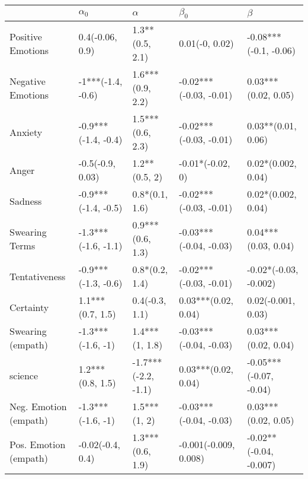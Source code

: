 \begin{tabular}{lllll}
\toprule
{} &           $\alpha_0$ &             $\alpha$ &               $\beta_0$ &                 $\beta$ \\
\midrule
Positive Emotions     &      0.4(-0.06, 0.9) &      1.3**(0.5, 2.1) &          0.01(-0, 0.02) &   -0.08***(-0.1, -0.06) \\
Negative Emotions     &    -1***(-1.4, -0.6) &     1.6***(0.9, 2.2) &  -0.02***(-0.03, -0.01) &     0.03***(0.02, 0.05) \\
Anxiety               &  -0.9***(-1.4, -0.4) &     1.5***(0.6, 2.3) &  -0.02***(-0.03, -0.01) &      0.03**(0.01, 0.06) \\
Anger                 &     -0.5(-0.9, 0.03) &        1.2**(0.5, 2) &        -0.01*(-0.02, 0) &      0.02*(0.002, 0.04) \\
Sadness               &  -0.9***(-1.4, -0.5) &       0.8*(0.1, 1.6) &  -0.02***(-0.03, -0.01) &      0.02*(0.002, 0.04) \\
Swearing Terms        &  -1.3***(-1.6, -1.1) &     0.9***(0.6, 1.3) &  -0.03***(-0.04, -0.03) &     0.04***(0.03, 0.04) \\
Tentativeness         &  -0.9***(-1.3, -0.6) &       0.8*(0.2, 1.4) &  -0.02***(-0.03, -0.01) &   -0.02*(-0.03, -0.002) \\
Certainty             &     1.1***(0.7, 1.5) &       0.4(-0.3, 1.1) &     0.03***(0.02, 0.04) &      0.02(-0.001, 0.03) \\
Swearing (empath)     &    -1.3***(-1.6, -1) &       1.4***(1, 1.8) &  -0.03***(-0.04, -0.03) &     0.03***(0.02, 0.04) \\
science               &     1.2***(0.8, 1.5) &  -1.7***(-2.2, -1.1) &     0.03***(0.02, 0.04) &  -0.05***(-0.07, -0.04) \\
Neg. Emotion (empath) &    -1.3***(-1.6, -1) &         1.5***(1, 2) &  -0.03***(-0.04, -0.03) &     0.03***(0.02, 0.05) \\
Pos. Emotion (empath) &     -0.02(-0.4, 0.4) &     1.3***(0.6, 1.9) &   -0.001(-0.009, 0.008) &  -0.02**(-0.04, -0.007) \\
\bottomrule
\end{tabular}
